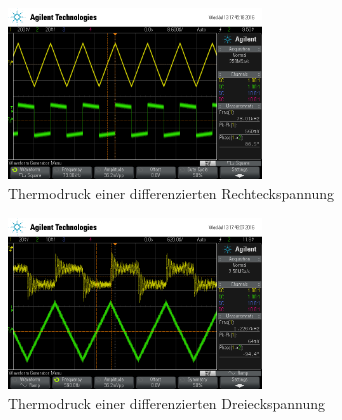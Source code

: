 \begin{figure}
	\centering
	\includegraphics[width=0.6\textwidth]{img/scope_5_diff_rechteck.png}
	\caption{Thermodruck einer differenzierten Rechteckspannung}
	\label{fig:diffrechteck}
\end{figure}

\begin{figure}
	\centering
	\includegraphics[width=0.6\textwidth]{img/scope_6_diff_dreieck.png}
	\caption{Thermodruck einer differenzierten Dreieckspannung}
	\label{fig:diffdreieck}
\end{figure}

